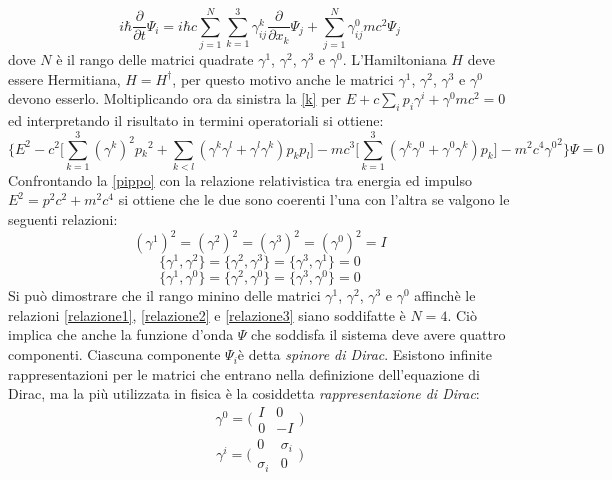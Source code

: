 \begin{equation}
  i\hbar \frac{\partial}{\partial t}\Psi_i = i\hbar c\sum_{j=1}^{N}\sum_{k=1}^{3}\gamma_{ij}^k\frac{\partial}{\partial x_k} \Psi_j +\sum_{j=1}^{N}\gamma_{ij}^0mc^2\Psi_j
\end{equation}
dove $N$ è il rango delle matrici quadrate $\gamma^1$, $\gamma^2$, $\gamma^3$ e $\gamma^0$.
L'Hamiltoniana $H$ deve essere Hermitiana, $H = H^{\dag}$, per questo motivo anche le matrici $\gamma^1$, $\gamma^2$, $\gamma^3$ e $\gamma^0$ devono
esserlo. Moltiplicando ora da sinistra la \eqref{k} per $E + c\sum_i p_i\gamma^i + \gamma^0 mc^2 = 0$ ed interpretando il risultato in termini operatoriali si ottiene:
\begin{equation}\label{pippo}
 \Big\{E^2-c^2\Big[\sum_{k=1}^{3}(\gamma^k)^2p{_k}^2 + \sum_{k<l}(\gamma^k\gamma^l+\gamma^l\gamma^k)p_kp_l\Big] - mc^3\Big[\sum_{k=1}^{3}(\gamma^k\gamma^0+\gamma^0\gamma^k)p_k\Big] - m^2c^4{\gamma^0}^2\Big\}\Psi = 0
\end{equation}
Confrontando la \eqref{pippo} con la relazione relativistica tra energia ed impulso $E^2 = p^2c^2 + m^2c^4$ si ottiene che le due sono coerenti l'una con l'altra
se valgono le seguenti relazioni:
\begin{equation} \label{relazione1}
 (\gamma^1)^2=(\gamma^2)^2=(\gamma^3)^2=(\gamma^0)^2 = I
\end{equation}
\begin{equation} \label{relazione2}
 \{\gamma^1,\gamma^2\} = \{\gamma^2,\gamma^3\} = \{\gamma^3,\gamma^1\} = 0
\end{equation}
\begin{equation} \label{relazione3}
 \{\gamma^1,\gamma^0\} = \{\gamma^2,\gamma^0\} = \{\gamma^3,\gamma^0\} = 0
\end{equation}
Si può dimostrare che il rango minino delle matrici $\gamma^1$, $\gamma^2$, $\gamma^3$ e $\gamma^0$ affinchè le relazioni 
\eqref{relazione1}, \eqref{relazione2} e \eqref{relazione3} siano soddifatte è $N = 4$. Ciò implica che anche la funzione d'onda $\Psi$ che soddisfa il 
sistema deve avere quattro componenti. Ciascuna componente $\Psi_i$è detta \emph{spinore di Dirac}. 
Esistono infinite rappresentazioni per le matrici che entrano nella definizione dell'equazione di Dirac, ma la più utilizzata in fisica è la cosiddetta 
\emph{rappresentazione di Dirac}:
\begin{equation}
 \gamma^0 = \Big(\begin{matrix} I & 0 \\ 0 & -I \end{matrix}\Big)
\end{equation}
\begin{equation}
 \gamma^i = \Big(\begin{matrix} 0 & \sigma_i \\ \sigma_i & 0 \end{matrix}\Big)
\end{equation}

